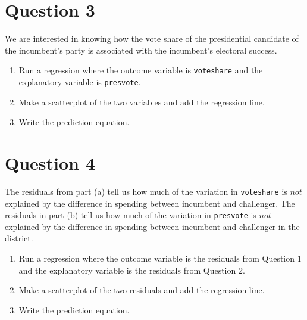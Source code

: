 \documentclass[12pt,letterpaper]{article}
\begin{document}
	\newpage	
	
\section*{Question 3}

\noindent We are interested in knowing how the vote share of the presidential candidate of the incumbent's party is associated with the incumbent's electoral success.
	\vspace{.25cm}
	\begin{enumerate}
		\item Run a regression where the outcome variable is \texttt{voteshare} and the explanatory variable is \texttt{presvote}.
		
		
			\vspace{5cm}
			
			
		\item Make a scatterplot of the two variables and add the regression line. 
			\vspace{5cm}
			
			
			
		\item Write the prediction equation.
		
		
		
		
		
		
	\end{enumerate}
	

\newpage	
\section*{Question 4}
\noindent The residuals from part (a) tell us how much of the variation in \texttt{voteshare} is $not$ explained by the difference in spending between incumbent and challenger. The residuals in part (b) tell us how much of the variation in \texttt{presvote} is $not$ explained by the difference in spending between incumbent and challenger in the district.
	\begin{enumerate}
		\item Run a regression where the outcome variable is the residuals from Question 1 and the explanatory variable is the residuals from Question 2.	\vspace{6cm}
		
		
		
		
		\item Make a scatterplot of the two residuals and add the regression line. 	\vspace{6cm}
		
		
		\item Write the prediction equation.
	
	
	\end{enumerate}
	
\end{document}
